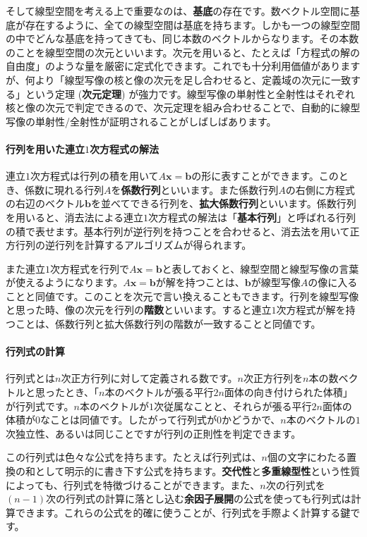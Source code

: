 そして線型空間を考える上で重要なのは、\textbf{基底}の存在です。数ベクトル空間に基底が存在するように、全ての線型空間は基底を持ちます。しかも一つの線型空間の中でどんな基底を持ってきても、同じ本数のベクトルからなります。その本数のことを線型空間の次元といいます。次元を用いると、たとえば「方程式の解の自由度」のような量を厳密に定式化できます。これでも十分利用価値がありますが、何より「線型写像の核と像の次元を足し合わせると、定義域の次元に一致する」という定理 (\textbf{次元定理}) が強力です。線型写像の単射性と全射性はそれぞれ核と像の次元で判定できるので、次元定理を組み合わせることで、自動的に線型写像の単射性/全射性が証明されることがしばしばあります。

\paragraph{行列を用いた連立$1$次方程式の解法}

連立$1$次方程式は行列の積を用いて$A\bm{x} = \bm{b}$の形に表すことができます。このとき、係数に現れる行列$A$を\textbf{係数行列}といいます。また係数行列$A$の右側に方程式の右辺のベクトル$\bm{b}$を並べてできる行列を、\textbf{拡大係数行列}といいます。係数行列を用いると、消去法による連立$1$次方程式の解法は「\textbf{基本行列}」と呼ばれる行列の積で表せます。基本行列が逆行列を持つことを合わせると、消去法を用いて正方行列の逆行列を計算するアルゴリズムが得られます。

また連立$1$次方程式を行列で$A\bm{x} = \bm{b}$と表しておくと、線型空間と線型写像の言葉が使えるようになります。$A\bm{x} = \bm{b}$が解を持つことは、$\bm{b}$が線型写像$A$の像に入ることと同値です。このことを次元で言い換えることもできます。行列を線型写像と思った時、像の次元を行列の\textbf{階数}といいます。すると連立$1$次方程式が解を持つことは、係数行列と拡大係数行列の階数が一致することと同値です。

\paragraph{行列式の計算}

行列式とは$n$次正方行列に対して定義される数です。$n$次正方行列を$n$本の数ベクトルと思ったとき、「$n$本のベクトルが張る平行$2n$面体の向き付けられた体積」が行列式です。$n$本のベクトルが$1$次従属なことと、それらが張る平行$2n$面体の体積が$0$なことは同値です。したがって行列式が$0$かどうかで、$n$本のベクトルの$1$次独立性、あるいは同じことですが行列の正則性を判定できます。

この行列式は色々な公式を持ちます。たとえば行列式は、$n$個の文字にわたる置換の和として明示的に書き下す公式を持ちます。\textbf{交代性}と\textbf{多重線型性}という性質によっても、行列式を特徴づけることができます。また、$n$次の行列式を$(n - 1)$次の行列式の計算に落とし込む\textbf{余因子展開}の公式を使っても行列式は計算できます。これらの公式を的確に使うことが、行列式を手際よく計算する鍵です。

